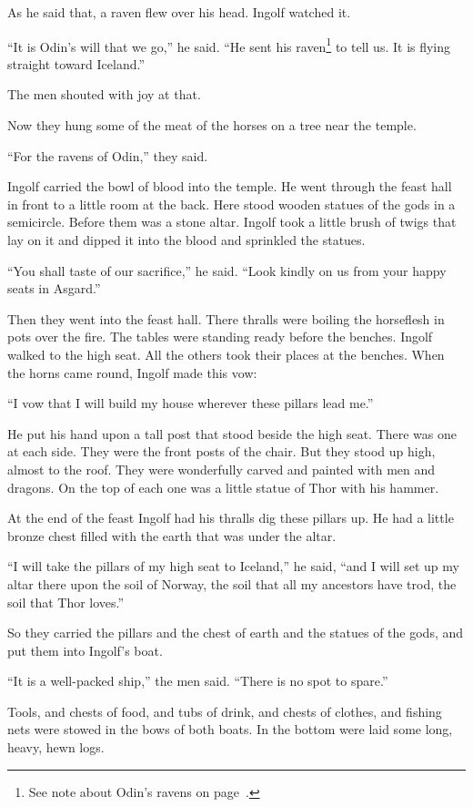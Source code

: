 As he said that, a raven flew over his head. Ingolf watched it.

``It is Odin's will that we go,'' he said. ``He sent his raven\footnote{
See note about Odin's ravens on page~\pageref{odins-ravens}.} to tell us.
It is flying straight toward Iceland.''

The men shouted with joy at that.

Now they hung some of the meat of the horses on a tree near the temple.

``For the ravens of Odin,'' they said.

Ingolf carried the bowl of blood into the temple. He went through the
feast hall in front to a little room at the back. Here stood wooden
statues of the gods in a semicircle. Before them was a stone altar.
Ingolf took a little brush of twigs that lay on it and dipped it into
the blood and sprinkled the statues.

``You shall taste of our sacrifice,'' he said. ``Look kindly on us from
your happy seats in Asgard.''

Then they went into the feast hall. There thralls were boiling the
horseflesh in pots over the fire. The tables were standing ready before
the benches. Ingolf walked to the high seat. All the others took their
places at the benches. When the horns came round, Ingolf made this vow:

``I vow that I will build my house wherever these pillars lead me.''

He put his hand upon a tall post that stood beside the high seat. There
was one at each side. They were the front posts of the chair. But they
stood up high, almost to the roof. They were wonderfully carved and
painted with men and dragons. On the top of each one was a little statue
of Thor with his hammer.

At the end of the feast Ingolf had his thralls dig these pillars up. He
had a little bronze chest filled with the earth that was under the
altar.

``I will take the pillars of my high seat to Iceland,'' he said, ``and I
will set up my altar there upon the soil of Norway, the soil that all my
ancestors have trod, the soil that Thor loves.''

So they carried the pillars and the chest of earth and the statues of
the gods, and put them into Ingolf's boat.

``It is a well-packed ship,'' the men said. ``There is no spot to
spare.''

Tools, and chests of food, and tubs of drink, and chests of clothes, and
fishing nets were stowed in the bows of both boats. In the bottom were
laid some long, heavy, hewn logs.

